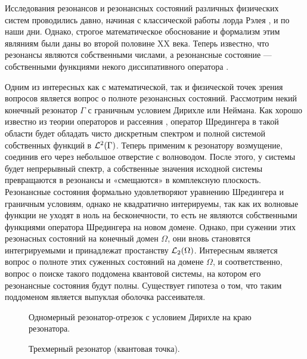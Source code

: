 \startprefacepage

Исследования резонансов и резонансных состояний различных физических систем проводились давно, начиная с классической работы лорда Рэлея \cite{rayleigh1916theory}, и по наши дни. Однако, строгое математическое обоснование и формализм этим являниям были даны во второй половине XX века. Теперь известно, что резонансы являются собственными числами, а резонансные состояние — собственными функциями некого диссипативного оператора \cite{lax1990scattering, adamjan1965class}.

Одним из интересных как с математической, так и физической точек зрения вопросов является вопрос о полноте резонансных состояний. Рассмотрим некий конечный резонатор $\Gamma$ с граничным условием Дирихле или Неймана. Как хорошо известно из теории операторов и рассеяния \cite{reed1980methods}, оператор Шредингера в такой области будет обладать чисто дискретным спектром и полной системой собственных функций в $\mcL^2(\Gamma)$. Теперь применим к резонатору возмущение, соединив его через небольшое отверстие с волноводом. После этого, у системы будет непрерывный спектр, а собственные значения исходной системы превращаются в резонансы и «смещаются» в комплексную плоскость. Резонансные состояния формально удовлетворяют уравнению Шредингера и граничным условиям, однако не квадратично интерируемы, так как их волновые функции не уходят в ноль на бесконечности, то есть не являются собственными функциями оператора Шредингера на новом домене. Однако, при сужении этих резонасных состояний на конечный домен $\Omega$, они вновь становятся интегрируемыми и принадлежат простанству $\mcL_2(\Omega)$. Интересным является вопрос о полноте этих суженных состояний на домене $\Omega$, и соответственно, вопрос о поиске такого поддомена квантовой системы, на котором его резонансные состояния будут полны. Существует гипотеза о том, что таким поддоменом является выпуклая оболочка рассеивателя.

\begin{figure}
\renewcommand\thefigure{А}
\centering
\begin{tikzpicture}[scale=1.1]

\end{tikzpicture}
\caption{Одномерный резонатор-отрезок с условием Дирихле на краю резонатора.} \label{fig:res_segment}
\end{figure}

\begin{figure}
\renewcommand\thefigure{Б}
\centering
\begin{tikzpicture}[scale=1.1]

\end{tikzpicture}
\caption{Трехмерный резонатор (квантовая точка).} \label{fig:res_3d}
\end{figure}

